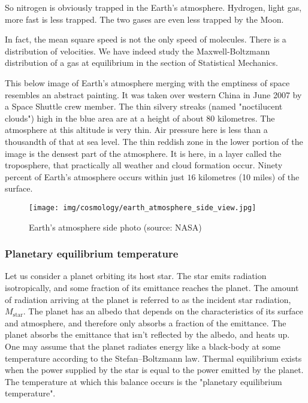 	So nitrogen is obviously trapped in the Earth's atmosphere. Hydrogen, light gas, more fast is less trapped. The two gases are even less trapped by the Moon.
	\begin{tcolorbox}[title=Remark,colframe=black,arc=10pt]
	In fact, the mean square speed is not the only speed of molecules. There is a distribution of velocities. We have indeed study the Maxwell-Boltzmann distribution of a gas at equilibrium in the section of Statistical Mechanics.
	\end{tcolorbox}
	This below image of Earth’s atmosphere merging with the emptiness of space resembles an abstract painting. It was taken over western China in June 2007 by a Space Shuttle crew member. The thin silvery streaks (named "noctilucent clouds") high in the blue area are at a height of about $80$ kilometres. The atmosphere at this altitude is very thin. Air pressure here is less than a thousandth of that at sea level. The thin reddish zone in the lower portion of the image is the densest part of the atmosphere. It is here, in a layer called the troposphere, that practically all weather and cloud formation occur. Ninety percent of Earth’s atmosphere occurs within just $16$ kilometres (10 miles) of the surface.
	\begin{figure}[H]
		\centering
		\texttt{[image: img/cosmology/earth\_atmosphere\_side\_view.jpg]}	
		\caption[Earth's atmosphere side photo]{Earth's atmosphere side photo (source: NASA)}
	\end{figure}
	
	\subsubsection{Planetary equilibrium temperature}\label{planetary equilibrium temperature}
	Let us consider a planet orbiting its host star. The star emits radiation isotropically, and some fraction of its emittance reaches the planet. The amount of radiation arriving at the planet is referred to as the incident star radiation, $M_{\text{star}}$. The planet has an albedo that depends on the characteristics of its surface and atmosphere, and therefore only absorbs a fraction of the emittance. The planet absorbs the emittance that isn't reflected by the albedo, and heats up. One may assume that the planet radiates energy like a black-body at some temperature according to the Stefan–Boltzmann law. Thermal equilibrium exists when the power supplied by the star is equal to the power emitted by the planet. The temperature at which this balance occurs is the "planetary equilibrium temperature".
	
